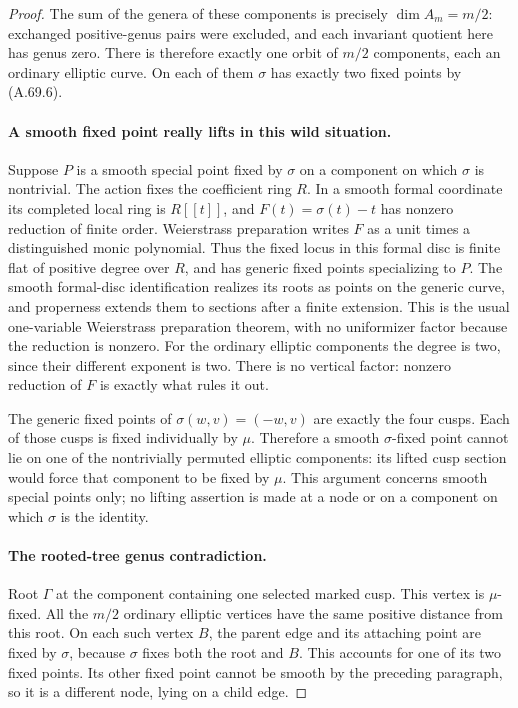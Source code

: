 \begin{proof}
The sum of the genera of these components is precisely
\(\dim A_m=m/2\): exchanged positive-genus pairs were excluded,
and each invariant quotient here has genus zero. There is
therefore exactly one orbit of \(m/2\) components, each an
ordinary elliptic curve. On each of them \(\sigma\) has exactly
two fixed points by (A.69.6).

\paragraph{A smooth fixed point really lifts in this wild situation.}
Suppose \(P\) is a smooth special point fixed by \(\sigma\) on
a component on which \(\sigma\) is nontrivial. The action fixes
the coefficient ring \(R\). In a smooth formal coordinate its
completed local ring is \(R[[t]]\), and
\(F(t)=\sigma(t)-t\) has nonzero reduction of finite order.
Weierstrass preparation writes \(F\) as a unit times a
distinguished monic polynomial. Thus the fixed locus in this
formal disc is finite flat of positive degree over \(R\), and
has generic fixed points specializing to \(P\). The smooth
formal-disc identification realizes its roots as points on the
generic curve, and properness extends them to sections after a
finite extension. This is the usual
one-variable Weierstrass preparation theorem, with no uniformizer
factor because the reduction is nonzero.
\cite[Corollary 2.16]{fghVonk2021}
For the ordinary
elliptic components the degree is two, since their different
exponent is two. There is no vertical factor: nonzero reduction
of \(F\) is exactly what rules it out.

The generic fixed points of \(\sigma(w,v)=(-w,v)\) are exactly
the four cusps. Each of those cusps is fixed individually by
\(\mu\). Therefore a smooth \(\sigma\)-fixed point cannot lie
on one of the nontrivially permuted elliptic components: its
lifted cusp section would force that component to be fixed by
\(\mu\). This argument concerns smooth special points only;
no lifting assertion is made at a node or on a component on
which \(\sigma\) is the identity.

\paragraph{The rooted-tree genus contradiction.}
Root \(\Gamma\) at the component containing one selected marked
cusp. This vertex is \(\mu\)-fixed. All the \(m/2\) ordinary
elliptic vertices have the same positive distance from this root.
On each such vertex \(B\), the parent edge and its attaching
point are fixed by \(\sigma\), because \(\sigma\) fixes both
the root and \(B\). This accounts for one of its two fixed
points. Its other fixed point cannot be smooth by the preceding
paragraph, so it is a different node, lying on a child edge.


\end{proof}
